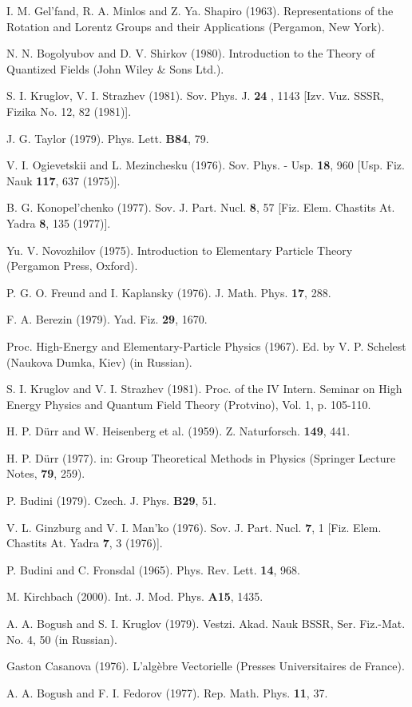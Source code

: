 \documentclass[a4paper,12pt]{article}
\begin{document}
\begin{thebibliography}{99}
  I. M. Gel'fand, R. A. Minlos and Z. Ya. Shapiro (1963).
Representations of the Rotation and Lorentz Groups and their Applications
(Pergamon, New York).

  N. N. Bogolyubov and D. V. Shirkov (1980). Introduction to the
Theory of Quantized Fields (John Wiley \& Sons Ltd.).

  S. I. Kruglov, V. I. Strazhev (1981). Sov. Phys. J. \textbf{24}
, 1143 [Izv. Vuz. SSSR, Fizika No. 12, 82 (1981)].

  J. G. Taylor (1979). Phys. Lett. \textbf{B84}, 79.

  V. I. Ogievetskii and L. Mezinchesku (1976). Sov. Phys. - Usp.
\textbf{18}, 960 [Usp. Fiz. Nauk \textbf{117}, 637 (1975)].

  B. G. Konopel'chenko (1977). Sov. J. Part. Nucl. \textbf{8},
57 [Fiz. Elem. Chastits At. Yadra \textbf{8}, 135 (1977)].

  Yu. V. Novozhilov (1975). Introduction to Elementary Particle
Theory (Pergamon Press, Oxford).

  P. G. O. Freund and I. Kaplansky (1976). J. Math. Phys.
\textbf{17}, 288.

  F. A. Berezin (1979). Yad. Fiz. \textbf{29}, 1670.

  Proc. High-Energy and Elementary-Particle Physics (1967). Ed.
by V. P. Schelest (Naukova Dumka, Kiev) (in Russian).

  S. I. Kruglov and V. I. Strazhev (1981). Proc. of the IV
Intern. Seminar on High Energy Physics and Quantum Field Theory (Protvino),
Vol. 1, p. 105-110.

  H. P. D\"urr and W. Heisenberg et al. (1959). Z. Naturforsch.
\textbf{149}, 441.

  H. P. D\"urr (1977). in: Group Theoretical Methods in Physics
(Springer Lecture Notes, \textbf{79}, 259).

  P. Budini (1979). Czech. J. Phys. \textbf{B29}, 51.

  V. L. Ginzburg and V. I. Man'ko (1976). Sov. J. Part. Nucl.
\textbf{7}, 1 [Fiz. Elem. Chastits At. Yadra \textbf{7}, 3 (1976)].

  P. Budini and C. Fronsdal (1965). Phys. Rev. Lett.
\textbf{14}, 968.

  M. Kirchbach (2000). Int. J. Mod. Phys. \textbf{A15}, 1435.

  A. A. Bogush and S. I. Kruglov (1979). Vestzi. Akad. Nauk
BSSR, Ser. Fiz.-Mat. No. 4, 50 (in Russian).

  Gaston Casanova (1976). L'alg\`ebre Vectorielle
(Presses Universitaires de France).

  A. A. Bogush and F. I. Fedorov (1977). Rep. Math. Phys.
\textbf{11}, 37.

\end{thebibliography}
\end{document}
